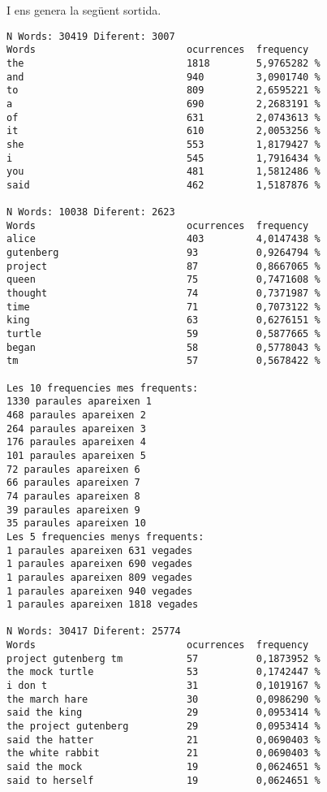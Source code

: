 \documentclass{report}
\begin{document}
\newpage

I ens genera la següent sortida. \\

\begin{verbatim}
N Words: 30419 Diferent: 3007
Words                          ocurrences  frequency
the                            1818        5,9765282 %
and                            940         3,0901740 %
to                             809         2,6595221 %
a                              690         2,2683191 %
of                             631         2,0743613 %
it                             610         2,0053256 %
she                            553         1,8179427 %
i                              545         1,7916434 %
you                            481         1,5812486 %
said                           462         1,5187876 %

N Words: 10038 Diferent: 2623
Words                          ocurrences  frequency
alice                          403         4,0147438 %
gutenberg                      93          0,9264794 %
project                        87          0,8667065 %
queen                          75          0,7471608 %
thought                        74          0,7371987 %
time                           71          0,7073122 %
king                           63          0,6276151 %
turtle                         59          0,5877665 %
began                          58          0,5778043 %
tm                             57          0,5678422 %

Les 10 frequencies mes frequents:
1330 paraules apareixen 1
468 paraules apareixen 2
264 paraules apareixen 3
176 paraules apareixen 4
101 paraules apareixen 5
72 paraules apareixen 6
66 paraules apareixen 7
74 paraules apareixen 8
39 paraules apareixen 9
35 paraules apareixen 10
Les 5 frequencies menys frequents:
1 paraules apareixen 631 vegades
1 paraules apareixen 690 vegades
1 paraules apareixen 809 vegades
1 paraules apareixen 940 vegades
1 paraules apareixen 1818 vegades

N Words: 30417 Diferent: 25774
Words                          ocurrences  frequency
project gutenberg tm           57          0,1873952 %
the mock turtle                53          0,1742447 %
i don t                        31          0,1019167 %
the march hare                 30          0,0986290 %
said the king                  29          0,0953414 %
the project gutenberg          29          0,0953414 %
said the hatter                21          0,0690403 %
the white rabbit               21          0,0690403 %
said the mock                  19          0,0624651 %
said to herself                19          0,0624651 %




\end{verbatim}
\end{document}
